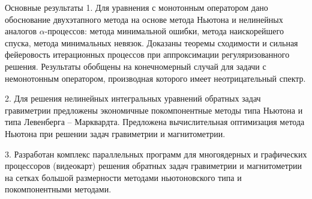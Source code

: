 \documentclass[10pt,pdf, mathserif, hyperref={unicode}]{beamer}
\begin{document}

\begin{frame}{Основные результаты}
	1. Для уравнения с монотонным оператором дано обоснование двухэтапного метода на основе метода Ньютона и нелинейных аналогов $\alpha$-процессов: метода минимальной ошибки, метода наискорейшего спуска, метода минимальных невязок. Доказаны теоремы сходимости и сильная фейеровость итерационных процессов при аппроксимации регуляризованного решения. Результаты обобщены на конечномерный случай для задачи с немонотонным оператором, производная которого имеет неотрицательный спектр.
	
	2. Для решения нелинейных интегральных уравнений обратных задач гравиметрии предложены экономичные покомпонентные методы 
	типа Ньютона и типа Левенберга – Марквардта. Предложена вычислительная оптимизация метода 
	Ньютона при решении задач гравиметрии и магнитометрии.
	
	3. Разработан комплекс параллельных программ для многоядерных и графических процессоров (видеокарт) решения обратных задач гравиметрии и магнитометрии на сетках большой размерности методами ньютоновского типа и покомпонентными методами. 
	  	
\end{frame}
\end{document}
